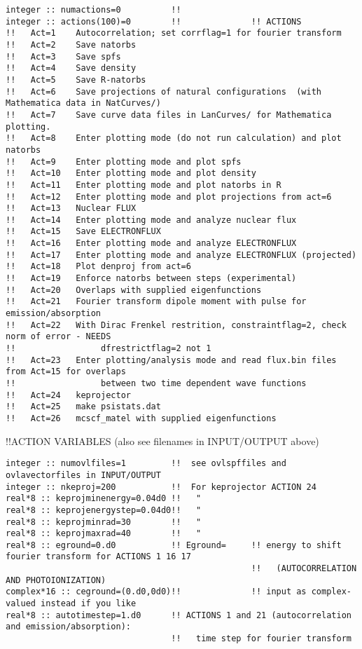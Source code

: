 \begin{verbatim}
integer :: numactions=0          !! 
integer :: actions(100)=0        !!              !! ACTIONS
!!   Act=1    Autocorrelation; set corrflag=1 for fourier transform
!!   Act=2    Save natorbs
!!   Act=3    Save spfs
!!   Act=4    Save density
!!   Act=5    Save R-natorbs
!!   Act=6    Save projections of natural configurations  (with Mathematica data in NatCurves/)
!!   Act=7    Save curve data files in LanCurves/ for Mathematica plotting.
!!   Act=8    Enter plotting mode (do not run calculation) and plot natorbs 
!!   Act=9    Enter plotting mode and plot spfs
!!   Act=10   Enter plotting mode and plot density
!!   Act=11   Enter plotting mode and plot natorbs in R
!!   Act=12   Enter plotting mode and plot projections from act=6
!!   Act=13   Nuclear FLUX 
!!   Act=14   Enter plotting mode and analyze nuclear flux
!!   Act=15   Save ELECTRONFLUX
!!   Act=16   Enter plotting mode and analyze ELECTRONFLUX 
!!   Act=17   Enter plotting mode and analyze ELECTRONFLUX (projected)
!!   Act=18   Plot denproj from act=6
!!   Act=19   Enforce natorbs between steps (experimental)
!!   Act=20   Overlaps with supplied eigenfunctions
!!   Act=21   Fourier transform dipole moment with pulse for emission/absorption
!!   Act=22   With Dirac Frenkel restrition, constraintflag=2, check norm of error - NEEDS
!!                 dfrestrictflag=2 not 1
!!   Act=23   Enter plotting/analysis mode and read flux.bin files from Act=15 for overlaps
!!                 between two time dependent wave functions
!!   Act=24   keprojector
!!   Act=25   make psistats.dat
!!   Act=26   mcscf_matel with supplied eigenfunctions 
\end{verbatim}
!!{\large \quad ACTION VARIABLES (also see filenames in INPUT/OUTPUT above)}
\begin{verbatim}
integer :: numovlfiles=1         !!  see ovlspffiles and ovlavectorfiles in INPUT/OUTPUT
integer :: nkeproj=200           !!  For keprojector ACTION 24
real*8 :: keprojminenergy=0.04d0 !!   "
real*8 :: keprojenergystep=0.04d0!!   "
real*8 :: keprojminrad=30        !!   "
real*8 :: keprojmaxrad=40        !!   "
real*8 :: eground=0.d0           !! Eground=     !! energy to shift fourier transform for ACTIONS 1 16 17
                                                 !!   (AUTOCORRELATION AND PHOTOIONIZATION)
complex*16 :: ceground=(0.d0,0d0)!!              !! input as complex-valued instead if you like
real*8 :: autotimestep=1.d0      !! ACTIONS 1 and 21 (autocorrelation and emission/absorption):
                                 !!   time step for fourier transform
\end{verbatim}
